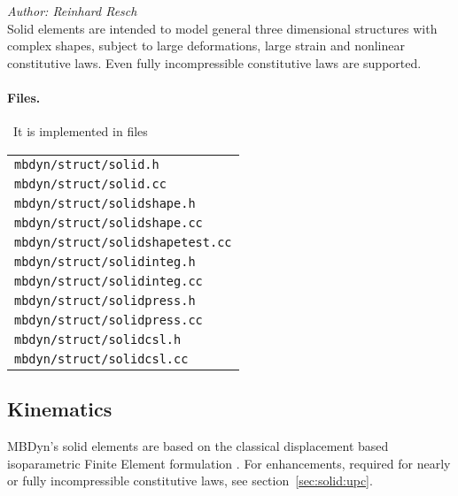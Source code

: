 %
%
%
%
%
%
%
%
\emph{Author: Reinhard Resch} \\
Solid elements are intended to model general three dimensional structures with complex shapes,
subject to large deformations, large strain and nonlinear constitutive laws.
Even fully incompressible constitutive laws are supported.
\paragraph{Files.} \
It is implemented in files\\
\begin{tabular}{l}
\texttt{mbdyn/struct/solid.h} \\
\texttt{mbdyn/struct/solid.cc} \\
\texttt{mbdyn/struct/solidshape.h} \\
\texttt{mbdyn/struct/solidshape.cc} \\
\texttt{mbdyn/struct/solidshapetest.cc} \\
\texttt{mbdyn/struct/solidinteg.h} \\
\texttt{mbdyn/struct/solidinteg.cc} \\
\texttt{mbdyn/struct/solidpress.h} \\
\texttt{mbdyn/struct/solidpress.cc} \\
\texttt{mbdyn/struct/solidcsl.h} \\
\texttt{mbdyn/struct/solidcsl.cc}
\end{tabular}
\subsection{Kinematics}
\label{sec:solid:interpol}
MBDyn's solid elements are based on the classical displacement based isoparametric Finite Element formulation \cite{BATHE2016}.
For enhancements, required for nearly or fully incompressible constitutive laws, see section~\ref{sec:solid:upc}.
